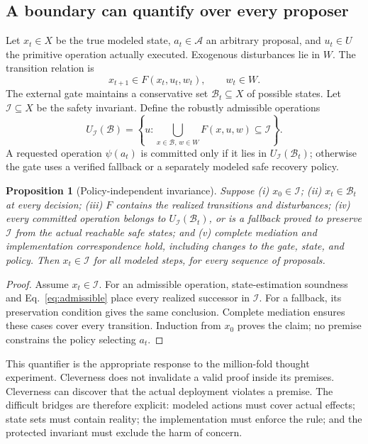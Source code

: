 \documentclass[10pt,twocolumn,letterpaper]{article}
\newtheorem{proposition}{Proposition}
\newcommand{\I}{\mathcal I}
\newcommand{\B}{\mathcal B}
\begin{document}
\subsection{A boundary can quantify over every proposer}
Let $x_t\in X$ be the true modeled state, $a_t\in\mathcal A$ an arbitrary proposal, and $u_t\in U$ the primitive operation actually executed. Exogenous disturbances lie in $W$. The transition relation is
\begin{equation}
x_{t+1}\in F(x_t,u_t,w_t),\qquad w_t\in W.
\end{equation}
The external gate maintains a conservative set $\B_t\subseteq X$ of possible states. Let $\I\subseteq X$ be the safety invariant. Define the robustly admissible operations
\begin{equation}
U_{\I}(\B)=\left\{u:\bigcup_{x\in\B,\,w\in W}F(x,u,w)\subseteq\I\right\}.
\label{eq:admissible}
\end{equation}
A requested operation $\psi(a_t)$ is committed only if it lies in $U_{\I}(\B_t)$; otherwise the gate uses a verified fallback or a separately modeled safe recovery policy.

\begin{proposition}[Policy-independent invariance]
\label{prop:invariant}
Suppose (i) $x_0\in\I$; (ii) $x_t\in\B_t$ at every decision; (iii) $F$ contains the realized transitions and disturbances; (iv) every committed operation belongs to $U_{\I}(\B_t)$, or is a fallback proved to preserve $\I$ from the actual reachable safe states; and (v) complete mediation and implementation correspondence hold, including changes to the gate, state, and policy. Then $x_t\in\I$ for all modeled steps, for every sequence of proposals.
\end{proposition}
\begin{proof}
Assume $x_t\in\I$. For an admissible operation, state-estimation soundness and Eq.~\eqref{eq:admissible} place every realized successor in $\I$. For a fallback, its preservation condition gives the same conclusion. Complete mediation ensures these cases cover every transition. Induction from $x_0$ proves the claim; no premise constrains the policy selecting $a_t$.
\end{proof}

This quantifier is the appropriate response to the million-fold thought experiment. Cleverness does not invalidate a valid proof inside its premises. Cleverness can discover that the actual deployment violates a premise. The difficult bridges are therefore explicit: modeled actions must cover actual effects; state sets must contain reality; the implementation must enforce the rule; and the protected invariant must exclude the harm of concern.
\end{document}
